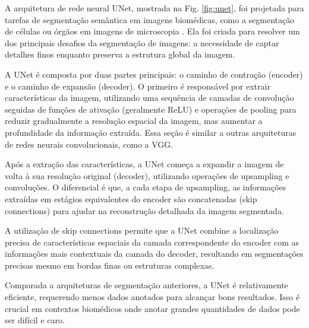 \documentclass[a4,12pt]{horizon-theme}
\begin{document}
A arquitetura de rede neural UNet, mostrada na Fig. \ref{fig:unet}, foi projetada para tarefas de segmentação semântica em imagens biomédicas, como a segmentação de células ou órgãos em imagens de microscopia \citep{unet}. Ela foi criada para resolver um dos principais desafios da segmentação de imagens: a necessidade de captar detalhes finos enquanto preserva a estrutura global da imagem.

A UNet é composta por duas partes principais: o caminho de contração (encoder) e o caminho de expansão (decoder). O primeiro é responsável por extrair características da imagem, utilizando uma sequência de camadas de convolução seguidas de funções de ativação (geralmente ReLU) e operações de pooling para reduzir gradualmente a resolução espacial da imagem, mas aumentar a profundidade da informação extraída. Essa seção é similar a outras arquiteturas de redes neurais convolucionais, como a VGG.

Após a extração das características, a UNet começa a expandir a imagem de volta à sua resolução original (decoder), utilizando operações de upsampling e convoluções. O diferencial é que, a cada etapa de upsampling, as informações extraídas em estágios equivalentes do encoder são concatenadas (skip connections) para ajudar na reconstrução detalhada da imagem segmentada.

A utilização de skip connections permite que a UNet combine a localização precisa de características espaciais da camada correspondente do encoder com as informações mais contextuais da camada do decoder, resultando em segmentações precisas mesmo em bordas finas ou estruturas complexas.

Comparada a arquiteturas de segmentação anteriores, a UNet é relativamente eficiente, requerendo menos dados anotados para alcançar bons resultados. Isso é crucial em contextos biomédicos onde anotar grandes quantidades de dados pode ser difícil e caro.

\end{document}
